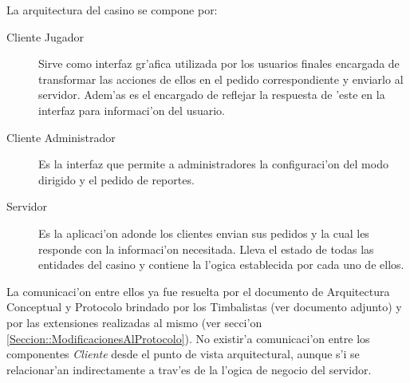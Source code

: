 La arquitectura del casino se compone por:

\begin{description}
\item[Cliente Jugador] Sirve como interfaz gr'afica utilizada por los usuarios finales encargada de transformar las acciones de ellos en el pedido correspondiente y enviarlo al servidor. Adem'as es el encargado de reflejar la respuesta de 'este en la interfaz para informaci'on del usuario.
\item[Cliente Administrador] Es la interfaz que permite a administradores la configuraci'on del modo dirigido y el pedido de reportes.
\item[Servidor] Es la aplicaci'on adonde los clientes envian sus pedidos y la cual les responde con la informaci'on necesitada. Lleva el estado de todas las entidades del casino y contiene la l'ogica establecida por cada uno de ellos.
\end{description}

La comunicaci'on entre ellos ya fue resuelta por el documento de Arquitectura Conceptual y Protocolo brindado por los Timbalistas (ver documento adjunto) y por las extensiones realizadas al mismo (ver secci'on \ref{Seccion::ModificacionesAlProtocolo}). No existir'a comunicaci'on entre los componentes {\it Cliente} desde el punto de vista arquitectural, aunque s'i se relacionar'an indirectamente a trav'es de la l'ogica de negocio del servidor.

